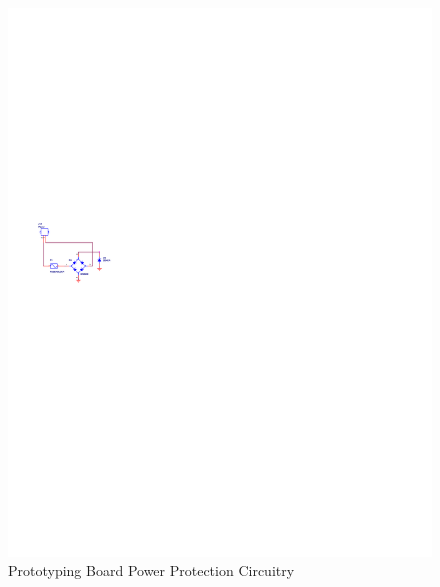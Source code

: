 \begin{figure}[ptb]
	\begin{centering}
		\includegraphics[scale=1.3]{Hardware/Figures/hardware-schematic_power_protection.pdf}
		\caption{Prototyping Board Power Protection Circuitry}
		\label{fig:hardware:schematic_power_protection}
	\end{centering}
\end{figure}

